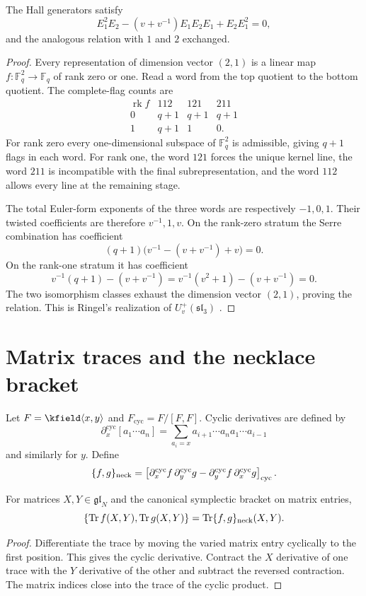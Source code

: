 \begin{theorem}
The Hall generators satisfy
\[
 E_1^2E_2-(v+v^{-1})E_1E_2E_1+E_2E_1^2=0,
\]
and the analogous relation with $1$ and $2$ exchanged.
\end{theorem}
\begin{proof}
Every representation of dimension vector $(2,1)$ is a linear map $f:\mathbb F_q^2\to\mathbb F_q$ of rank zero or one. Read a word from the top quotient to the bottom quotient. The complete-flag counts are
\[
\begin{array}{c|ccc}
\operatorname{rk}f&112&121&211\\ \hline
0&q+1&q+1&q+1\\
1&q+1&1&0.
\end{array}
\]
For rank zero every one-dimensional subspace of $\mathbb F_q^2$ is admissible, giving $q+1$ flags in each word. For rank one, the word $121$ forces the unique kernel line, the word $211$ is incompatible with the final subrepresentation, and the word $112$ allows every line at the remaining stage.

The total Euler-form exponents of the three words are respectively $-1,0,1$. Their twisted coefficients are therefore $v^{-1},1,v$. On the rank-zero stratum the Serre combination has coefficient
\[
 (q+1)\bigl(v^{-1}-(v+v^{-1})+v\bigr)=0.
\]
On the rank-one stratum it has coefficient
\[
 v^{-1}(q+1)-(v+v^{-1})
 =v^{-1}(v^2+1)-(v+v^{-1})=0.
\]
The two isomorphism classes exhaust the dimension vector $(2,1)$, proving the relation. This is Ringel's realization of $U_v^+(\mathfrak{sl}_3)$ \cite{Ringel,Green}.
\end{proof}

\chapter{Matrix traces and the necklace bracket}
Let $F=\kfield\angles{x,y}$ and $F_{\mathrm{cyc}}=F/[F,F]$. Cyclic derivatives are defined by
\[
 \partial_x^{\mathrm{cyc}}[a_1\cdots a_n]
 =\sum_{a_i=x}a_{i+1}\cdots a_na_1\cdots a_{i-1}
\]
and similarly for $y$. Define
\[
 \{f,g\}_{\mathrm{neck}}
 =\left[
 \partial_x^{\mathrm{cyc}}f\,\partial_y^{\mathrm{cyc}}g
 -\partial_y^{\mathrm{cyc}}f\,\partial_x^{\mathrm{cyc}}g\right]_{\mathrm{cyc}}.
\]

\begin{theorem}
For matrices $X,Y\in\mathfrak{gl}_N$ and the canonical symplectic bracket on matrix entries,
\[
 \{\operatorname{Tr} f(X,Y),\operatorname{Tr} g(X,Y)\}
 =\operatorname{Tr}\{f,g\}_{\mathrm{neck}}(X,Y).
\]
\end{theorem}
\begin{proof}
Differentiate the trace by moving the varied matrix entry cyclically to the first position. This gives the cyclic derivative. Contract the $X$ derivative of one trace with the $Y$ derivative of the other and subtract the reversed contraction. The matrix indices close into the trace of the cyclic product.
\end{proof}

